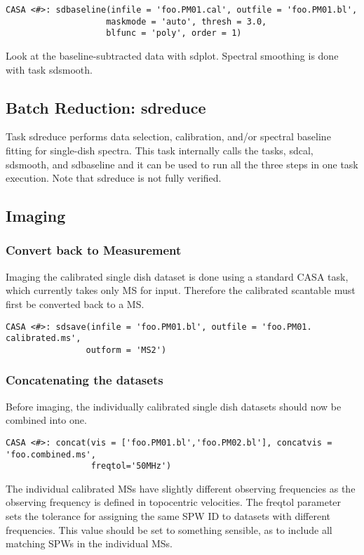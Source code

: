 \begin{verbatim}
CASA <#>: sdbaseline(infile = 'foo.PM01.cal', outfile = 'foo.PM01.bl', 
                    maskmode = 'auto', thresh = 3.0, 
                    blfunc = 'poly', order = 1)
\end{verbatim}

Look at the baseline-subtracted data with sdplot. 
Spectral smoothing is done with task sdsmooth. 


\subsection{Batch Reduction: sdreduce}

Task sdreduce performs data selection, calibration, and/or spectral
baseline fitting for single-dish spectra. This task internally calls the
tasks, sdcal, sdsmooth, and sdbaseline and it can be used to run all the
three steps in one task execution.
Note that sdreduce is not fully verified. 


\subsection{Imaging}
\label{section:sd.sdguide.imaging}

\subsubsection{Convert back to Measurement}
Imaging the calibrated single dish dataset is done using a standard CASA 
task, which currently takes only MS for input.
Therefore the calibrated scantable must first be converted back to a MS.

\begin{verbatim}
CASA <#>: sdsave(infile = 'foo.PM01.bl', outfile = 'foo.PM01.
calibrated.ms',
                outform = 'MS2')
\end{verbatim}

\subsubsection{Concatenating the datasets}
Before imaging, the individually calibrated single dish datasets should now be combined into one.

\begin{verbatim}
CASA <#>: concat(vis = ['foo.PM01.bl','foo.PM02.bl'], concatvis = 'foo.combined.ms',
                 freqtol='50MHz')
\end{verbatim}
The individual calibrated MSs have slightly different observing
frequencies as the observing frequency is defined in topocentric
velocities.  The freqtol parameter sets the tolerance for assigning
the same SPW ID to datasets with different frequencies.  This value
should be set to something sensible, as to include all matching SPWs
in the individual MSs.

